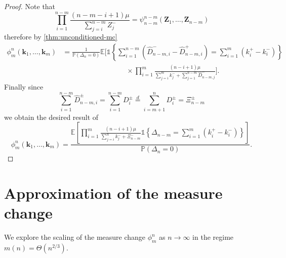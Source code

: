 \documentclass[draft]{scrartcl}
\newcommand{\E}{\mathbb E}
\newcommand{\biasD}{\hat{D}}
\newcommand{\unconmc}{\psi}
\newcommand{\conmc}{\phi}
\newcommand{\eqdist}{\overset{d}{=}}
\newcommand{\indi}{\mathds{1}}
\newcommand{\vect}{\mathbf}
\renewcommand{\Pr}{\mathbb P}
\begin{document}
\begin{proof}
    Note that
    \begin{equation}
        \prod_{i=1}^{n-m} \frac{(n - m - i + 1) \mu}{\sum_{j=i}^{n - m} Z_j^-} = \unconmc^{n-m}_{n-m}(\vect{Z}_1, \ldots, \vect{Z}_{n-m})
    \end{equation}
    therefore by \cref{thm:unconditioned-mc}
    \begin{align}
        \conmc^n_m(\vect{k}_1, \ldots, \vect{k}_m)
        &= \frac{1}{\Pr(\Delta_n = 0)}\E\Bigg[ \indi\left\{ \sum_{i=1}^{n-m} (\biasD_{n-m, i}^- - \biasD_{n-m, i}^+) = \sum_{i=1}^m (k^+_i - k^-_i)\right\} \nonumber \\
        &\hspace{9em} \times \prod_{i=1}^m \frac{(n - i + 1)\mu}{\sum_{j=i}^m k_j^- + \sum_{j = 1}^{n -m} \biasD_{n-m, j}^-} \Bigg].
    \end{align}
    Finally since
    \begin{equation}
        \sum_{i=1}^{n-m} \biasD^{\pm}_{n-m, i} = \sum_{i=1}^{n-m} D^{\pm}_i \eqdist \sum_{i=m+1}^n D^{\pm}_i = \Xi_{n-m}^{\pm}
    \end{equation}
    we obtain the desired result of
    \begin{equation}
        \conmc^n_m(\vect{k}_1, \ldots, \vect{k}_m) = \frac{
        \E \left[ \prod_{i=1}^m \frac{(n - i + 1)\mu}{\sum_{j=i}^n k_j^- + \Xi^-_{n - m}}
        \indi \left\{ \Delta_{n-m} = \sum_{i=1}^m (k^+_i - k^-_i) \right\}\right]
        }{\Pr(\Delta_n = 0)}.
    \end{equation}
\end{proof}

\section{Approximation of the measure change}

We explore the scaling of the measure change $\conmc^n_m$ as $n \to \infty$ in the regime $m(n) = \Theta(n^{2/3})$.
\end{document}
